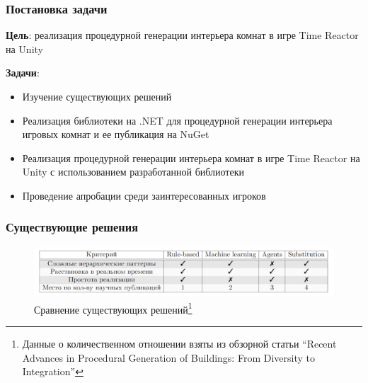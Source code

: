 \documentclass{beamer}
\begin{document}
\begin{frame}
  \frametitle{Постановка задачи}
  \textbf{Цель}: реализация процедурной генерации интерьера комнат в игре Time Reactor на Unity %

  \textbf{Задачи}:
  \begin{itemize}
    \item Изучение существующих решений
    \item Реализация библиотеки на .NET для процедурной генерации интерьера игровых комнат и ее публикация на NuGet
    \item Реализация процедурной генерации интерьера комнат в игре Time
Reactor на Unity с использованием разработанной библиотеки
    \item Проведение апробации среди заинтересованных игроков
  \end{itemize}
\end{frame}
            
\begin{frame}  
  \frametitle{Существующие решения}
  \vspace*{\fill}
  \begin{center}
        \begin{figure}
            \centering
            \includegraphics[width=1.0\textwidth]{pictures/comparison_table.png}
            \caption{Сравнение существующих решений\footnote{Данные о количественном отношении взяты из обзорной статьи \enquote{Recent Advances in Procedural Generation of Buildings: From Diversity to Integration}}}
        \end{figure}
  \end{center}
  \vspace*{\fill}
\end{frame}
            
\end{document}
